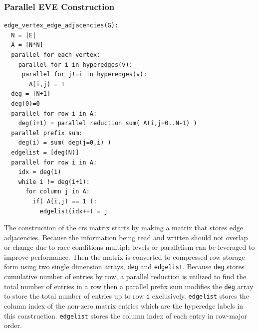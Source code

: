 \documentclass[graybox]{svmult}
\begin{document}
\subsubsection{Parallel EVE Construction}

\begin{verbatim}
edge_vertex_edge_adjacencies(G):
  N = |E|
  A = [N*N]
  parallel for each vertex:
    parallel for i in hyperedges(v):
     parallel for j!=i in hyperedges(v):
       A(i,j) = 1
  deg = [N+1]
  deg(0)=0
  parallel for row i in A:
    deg(i+1) = parallel reduction sum( A(i,j=0..N-1) )
  parallel prefix sum:
    deg(i) = sum( deg(j=0,i) )
  edgelist = [deg(N)]
  parallel for row i in A:
    idx = deg(i)
    while i != deg(i+1):
      for column j in A:
        if( A(i,j) == 1 ):
          edgelist(idx++) = j
\end{verbatim}

The construction of the crs matrix starts by making a matrix that stores edge
adjacencies.
Because the information being read and written should not overlap or change due
to race conditions multiple levels or parallelism can be leveraged to improve
performance.
Then the matrix is converted to compressed row storage form using two single
dimension arrays, \verb|deg| and \verb|edgelist|.
Because \verb|deg| stores cumulative number of entries by row, a parallel
reduction is utilized to find the total number of entries in a row then a
parallel prefix sum  modifies the \verb|deg| array to store the total number of
entries up to row \verb|i| exclusively.
\verb|edgelist| stores the column index of the non-zero matrix entries which are
the hyperedge labels in this construction.
\verb|edgelist| stores the column index of each entry in row-major order.
\end{document}
